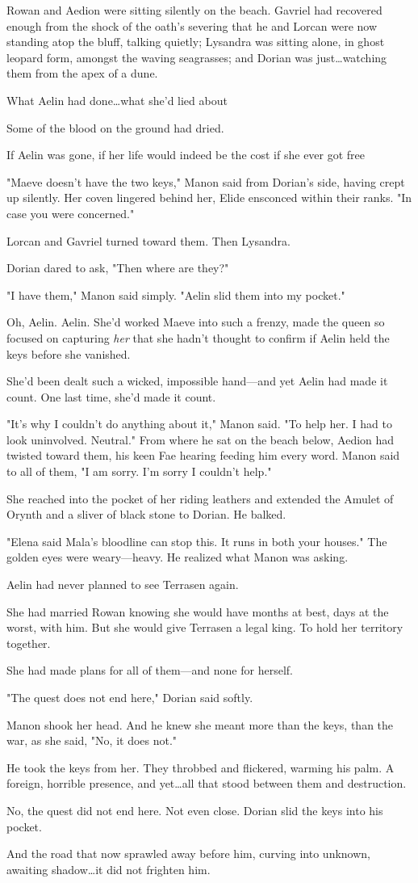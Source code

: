 Rowan and Aedion were sitting silently on the beach.
Gavriel had recovered enough from the shock of the oath's severing that he and Lorcan were now standing atop the bluff, talking quietly; Lysandra was sitting alone, in ghost leopard form, amongst the waving seagrasses; and Dorian was just\ldots watching them from the apex of a dune.

What Aelin had done\ldots what she'd lied about 

Some of the blood on the ground had dried.

If Aelin was gone, if her life would indeed be the cost if she ever got free 

"Maeve doesn't have the two keys," Manon said from Dorian's side, having crept up silently.
Her coven lingered behind her, Elide ensconced within their ranks.
"In case you were concerned."

Lorcan and Gavriel turned toward them.
Then Lysandra.

Dorian dared to ask, "Then where are they?"

"I have them," Manon said simply.
"Aelin slid them into my pocket."

Oh, Aelin.
Aelin.
She'd worked Maeve into such a frenzy, made the queen so focused on capturing \emph{her} that she hadn't thought to confirm if Aelin held the keys before she vanished.

She'd been dealt such a wicked, impossible hand---and yet Aelin had made it count.
One last time, she'd made it count.

"It's why I couldn't do anything about it," Manon said.
"To help her.
I had to look uninvolved.
Neutral."
From where he sat on the beach below, Aedion had twisted toward them, his keen Fae hearing feeding him every word.
Manon said to all of them, "I am sorry.
I'm sorry I couldn't help."

She reached into the pocket of her riding leathers and extended the Amulet of Orynth and a sliver of black stone to Dorian.
He balked.

"Elena said Mala's bloodline can stop this.
It runs in both your houses."
The golden eyes were weary---heavy.
He realized what Manon was asking.

Aelin had never planned to see Terrasen again.

She had married Rowan knowing she would have months at best, days at the worst, with him.
But she would give Terrasen a legal king.
To hold her territory together.

She had made plans for all of them---and none for herself.

"The quest does not end here," Dorian said softly.

Manon shook her head.
And he knew she meant more than the keys, than the war, as she said, "No, it does not."

He took the keys from her.
They throbbed and flickered, warming his palm.
A foreign, horrible presence, and yet\ldots all that stood between them and destruction.

No, the quest did not end here.
Not even close.
Dorian slid the keys into his pocket.

And the road that now sprawled away before him, curving into unknown, awaiting shadow\ldots it did not frighten him.
